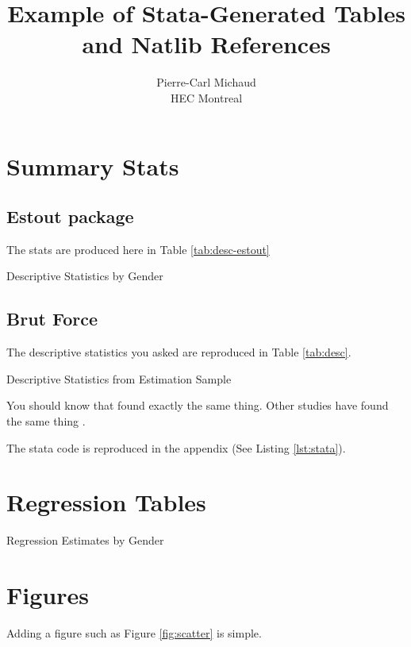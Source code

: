 \documentclass[11pt, oneside]{article}   	%
\title{Example of Stata-Generated Tables and Natlib References}
\author{Pierre-Carl Michaud \\ HEC Montreal}
\begin{document}
\maketitle

\section{Summary Stats}

\subsection{Estout package}

The stats are produced here in Table \ref{tab:desc-estout}

\begin{table}[htp]
  \centering
  
  \caption{Descriptive Statistics by Gender}
  \label{tab:desc-estout}
\end{table}

\subsection{Brut Force}
The descriptive statistics you asked are reproduced in Table \ref{tab:desc}. 

\begin{table}[htp]
\centering

\caption{Descriptive Statistics from Estimation Sample}
\label{tab:desc}
\end{table}

You should know that \citep{lusardi_financial_2007} found exactly the same thing. Other studies have found the same thing \citet{Lusardi2017OptimalInequality}.


The stata code is reproduced in the appendix (See Listing \ref{lst:stata}). 

\section{Regression Tables}

\begin{table}[htp]
  \centering
  
  \caption{Regression Estimates by Gender}
  \label{tab:reg-gender}
\end{table}

\section{Figures}

Adding a figure such as Figure \ref{fig:scatter} is simple. 
\end{document}
